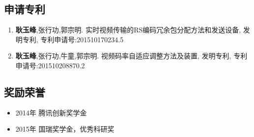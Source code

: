 \subsection*{申请专利}
\newitemsep
{\typebib
\begin{enumerate}
    \item \textbf{耿玉峰},张行功,郭宗明. 实时视频传输的RS编码冗余包分配方法和发送设备, 发明专利, 专利申请号:201510170234.5
    \item \textbf{耿玉峰},张行功,牛童,郭宗明. 视频码率自适应调整方法及装置, 发明专利, 专利申请号:201510208870.2
\end{enumerate}
}

\subsection*{奖励荣誉}
\newitemsep
{\typebib
\begin{itemize}
    \item 2014年 \quad 腾讯创新奖学金
    \item 2015年 \quad 国瑞奖学金，优秀科研奖
\end{itemize}
}
